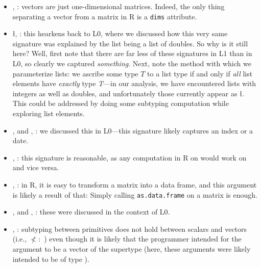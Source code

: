 \documentclass[acmsmall,10pt,review,anonymous]{acmart}\settopmatter{printfolios=true,printccs=false,printacmref=false}
\newcommand{\code}[1]{\lstinline|#1|\xspace}
\begin{document}
\begin{itemize}
	\item \D, : vectors are just one-dimensional matrices.
	Indeed, the only thing separating a vector from a matrix in R is a {\tt dims} attribute.
	
	\item \l, : this hearkens back to L0, where we discussed how this very same signature was explained by the list being a list of doubles.
	So why is it still here?
	Well, first note that there are far less of these signatures in L1 than in L0, so clearly we captured {\it something}.
	Next, note the method with which we parameterize lists: we ascribe some type $T$ to a list type  if and only if {\it all} list elements have {\it exactly} type {\it T}---in our analysis, we have encountered lists with integers as well as doubles, and unfortunately those currently appear as \l.
	This could be addressed by doing some subtyping computation while exploring list elements.
	
	\item \sC, \sD and \C, \D: we discussed this in L0---this signature likely captures an index or a date.
	
	\item {}, : this signature is reasonable, as any computation in R on  would work on  and vice versa.
	
	
	\item \df, : in R, it is easy to transform a matrix into a data frame, and this argument is likely a result of that:
	Simply calling \code{as.data.frame} on a matrix is enough.
	
	\item \sD, \sF and \sC, \sF: these were discussed in the context of L0.
	
	\item \I, \sD: subtyping between primitives does not hold between scalars and vectors (i.e., \I $\not<:$ \sD) even though it is likely that the programmer intended for the argument to be a vector of the supertype (here, these arguments were likely intended to be of type \D).
	
\end{itemize}
\end{document}
